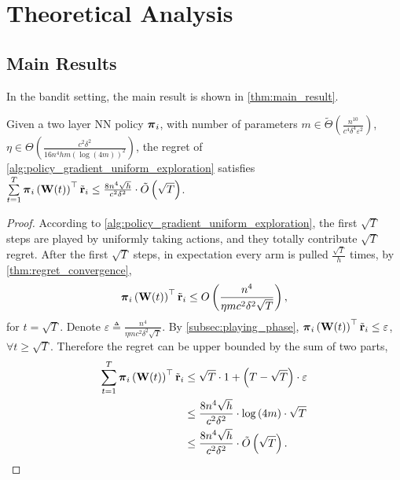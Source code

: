 \section{Theoretical Analysis}

\subsection{Main Results}
\label{subsec:main_results}

In the bandit setting, the main result is shown in \cref{thm:main_result}.

\begin{thm}
\label{thm:main_result}
    Given a two layer NN policy ${\boldsymbol{\pi}}_i$, with number of parameters $m \in \tilde{\Theta}\left( \frac{n^{10}}{c^4 \delta^4 \varepsilon^2} \right)$, $\eta \in \Theta\left( \frac{c^2 \delta^2}{16 n^4 h m \left( \log{\left(4m\right)} \right)^2} \right)$, the regret of \cref{alg:policy_gradient_uniform_exploration} satisfies $\sum\limits_{t=1}^{T}{ {\boldsymbol{\pi}}_i\left( {\mathbf{W}}(t) \right)^\top {\tilde{\mathbf{r}}}_i } \le  \frac{8 n^4 \sqrt{h}}{c^2 \delta^2} \cdot \tilde{O}\left( \sqrt{T} \right)$.
\end{thm}
\begin{proof}
According to \cref{alg:policy_gradient_uniform_exploration}, the first $\sqrt{T}$ steps are played by uniformly taking actions, and they totally contribute $\sqrt{T}$ regret. After the first $\sqrt{T}$ steps, in expectation every arm is pulled $\frac{\sqrt{T}}{h}$ times, by \cref{thm:regret_convergence}, 
\begin{equation*}
\begin{split}
    {\boldsymbol{\pi}}_i\left( {\mathbf{W}}(t) \right)^\top {\tilde{\mathbf{r}}}_i \le O\left( \frac{n^4}{\eta m c^2 \delta^2 \sqrt{T}} \right),
\end{split}
\end{equation*}
for $t = \sqrt{T}$. Denote $\varepsilon \triangleq \frac{n^4}{\eta m c^2 \delta^2 \sqrt{T}}$. By \cref{subsec:playing_phase}, ${\boldsymbol{\pi}}_i\left( {\mathbf{W}}(t) \right)^\top {\tilde{\mathbf{r}}}_i \le \varepsilon$, $\forall t \ge \sqrt{T}$. Therefore the regret can be upper bounded by the sum of two parts,
\begin{equation*}
\begin{split}
    \sum\limits_{t=1}^{T}{ {\boldsymbol{\pi}}_i\left( {\mathbf{W}}(t) \right)^\top {\tilde{\mathbf{r}}}_i } &\le \sqrt{T} \cdot 1 + \left(T - \sqrt{T} \right) \cdot \varepsilon \\
    &\le \frac{8 n^4 \sqrt{h}}{c^2 \delta^2} \cdot \log{\left(4m\right)} \cdot \sqrt{T} \\
    &\le \frac{8 n^4 \sqrt{h}}{c^2 \delta^2} \cdot \tilde{O}\left(\sqrt{T}\right). \qedhere
\end{split}
\end{equation*}
\end{proof}

